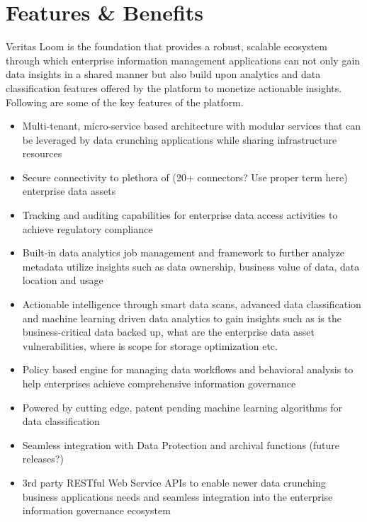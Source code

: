 \documentclass[letterpaper,10pt,english]{sphinxhowto}
\begin{document}
\section{Features \& Benefits}
\label{\detokenize{col/ds/mcdmp_ds_opt2:features-benefits}}
Veritas Loom is the foundation that provides a robust, scalable ecosystem through which enterprise information management applications can not only gain data insights in a shared manner but also build upon analytics and data classification features offered by the platform to monetize actionable insights. Following are some of the key features of the platform.

\begin{itemize}
\item {} 
Multi-tenant, micro-service based architecture with modular services that can be leveraged by data crunching applications while sharing infrastructure resources

\item {} 
Secure connectivity to plethora of (20+ connectors? Use proper term here) enterprise data assets

\item {} 
Tracking and auditing capabilities for enterprise data access activities to achieve regulatory compliance

\item {} 
Built-in data analytics job management and framework to further analyze metadata utilize insights such as data ownership, business value of data, data location and usage

\item {} 
Actionable intelligence through smart data scans, advanced data classification and machine learning driven data analytics to gain insights such as \textendash{} is the business-critical data backed up, what are the enterprise data asset vulnerabilities, where is scope for storage optimization etc.

\item {} 
Policy based engine for managing data workflows and behavioral analysis to help enterprises achieve comprehensive information governance

\item {} 
Powered by cutting edge, patent pending machine learning algorithms for data classification

\item {} 
Seamless integration with Data Protection and archival functions (future releases?)

\item {} 
3rd party RESTful Web Service APIs to enable newer data crunching business applications needs and seamless integration into the enterprise information governance ecosystem

\end{itemize}
\end{document}
